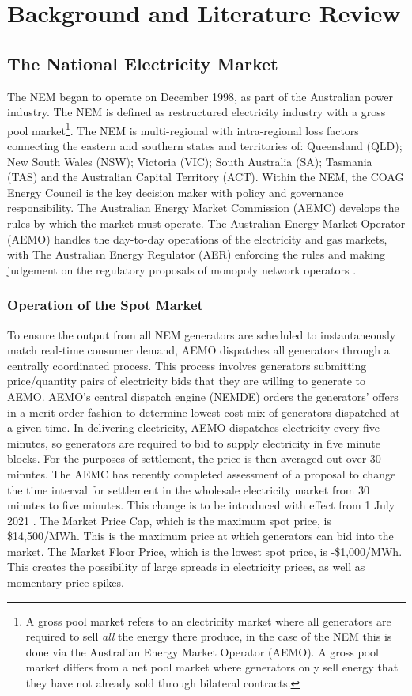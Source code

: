 \chapter{Background and Literature Review}
\section{ The National Electricity Market }
The NEM began to operate on December 1998, as part of the Australian power industry. The NEM is defined as restructured electricity industry with a gross pool market\footnote{A gross pool market refers to an electricity market where all generators are required to sell \textit{all} the energy there produce, in the case of the NEM this is done via the Australian Energy Market Operator (AEMO). A gross pool market differs from a net pool market where generators only sell energy that they have not already sold through bilateral contracts.}. The NEM is multi-regional with intra-regional loss factors connecting the eastern and southern states and territories of: Queensland (QLD); New South Wales (NSW); Victoria (VIC); South Australia (SA); Tasmania (TAS) and the Australian Capital Territory (ACT). Within the NEM, the COAG Energy Council is the key decision maker with policy and governance responsibility. The Australian Energy Market Commission (AEMC) develops the rules by which the market must operate. The Australian Energy Market Operator (AEMO) handles the day-to-day operations of the electricity and gas markets, with The Australian Energy Regulator (AER) enforcing the rules and making judgement on the regulatory proposals of monopoly network operators \parencite{EnergyGov}. 
\subsection{ Operation of the Spot Market }
To ensure the output from all NEM generators are scheduled to instantaneously match real-time consumer demand, AEMO dispatches all generators through a centrally coordinated process. This process involves generators submitting price/quantity pairs of electricity bids that they are willing to generate to AEMO. AEMO’s central dispatch engine (NEMDE) orders the generators’ offers in a merit-order fashion to determine lowest cost mix of generators dispatched at a given time. In delivering electricity, AEMO dispatches electricity every five minutes, so generators are required to bid to supply electricity in five minute blocks. For the purposes of settlement, the price is then averaged out over 30 minutes. The AEMC has recently completed assessment of a proposal to change the time interval for settlement in the wholesale electricity market from 30 minutes to five minutes. This change is to be introduced with effect from 1 July 2021 \parencite{5minSettle}. The Market Price Cap, which is the maximum spot price, is \$14,500/MWh. This is the maximum price at which generators can bid into the market. The Market Floor Price, which is the lowest spot price, is -\$1,000/MWh. This creates the possibility of large spreads in electricity prices, as well as momentary price spikes.
